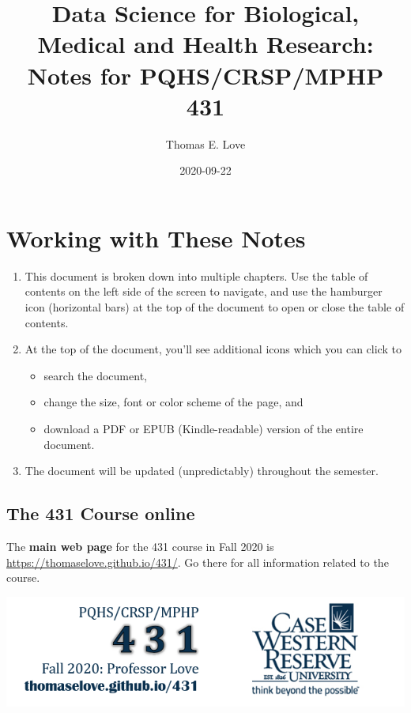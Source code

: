 \documentclass[
]{book}
\title{Data Science for Biological, Medical and Health Research: Notes for PQHS/CRSP/MPHP 431}
\author{Thomas E. Love}
\date{2020-09-22}
\providecommand{\tightlist}{%
  \setlength{\itemsep}{0pt}\setlength{\parskip}{0pt}}
\begin{document}
\maketitle

{
\setcounter{tocdepth}{1}
\tableofcontents
}
\hypertarget{working-with-these-notes}{%
\chapter*{Working with These Notes}\label{working-with-these-notes}}

\begin{enumerate}
\def\labelenumi{\arabic{enumi}.}
\tightlist
\item
  This document is broken down into multiple chapters. Use the table of contents on the left side of the screen to navigate, and use the hamburger icon (horizontal bars) at the top of the document to open or close the table of contents.
\item
  At the top of the document, you'll see additional icons which you can click to

  \begin{itemize}
  \tightlist
  \item
    search the document,
  \item
    change the size, font or color scheme of the page, and
  \item
    download a PDF or EPUB (Kindle-readable) version of the entire document.
  \end{itemize}
\item
  The document will be updated (unpredictably) throughout the semester.
\end{enumerate}

\hypertarget{the-431-course-online}{%
\section*{The 431 Course online}\label{the-431-course-online}}

The \textbf{main web page} for the 431 course in Fall 2020 is \url{https://thomaselove.github.io/431/}. Go there for all information related to the course.

\begin{center}\includegraphics[width=0.8\linewidth]{figures/431_foot2} \end{center}
\end{document}
